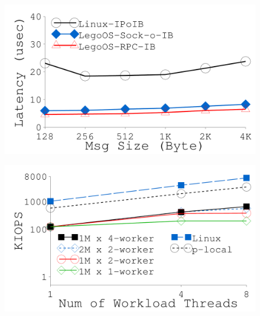 {
\begin{figure}[th]
\begin{minipage}{0.50\columnwidth}
\begin{center}
\centerline{\includegraphics[width=1.0\columnwidth]{Figures/g_plot_LEGO_latency.pdf}}
\vspace{-0.1in}
{
}
\end{center}
\end{minipage}
\begin{minipage}{0.50\columnwidth}
\vspace{0.13in}
\begin{center}
\centerline{\includegraphics[width=1.0\columnwidth]{Figures/g_plot_LEGO_iops_memory.pdf}}
\vspace{-0.1in}
{
}
\end{center}
\end{minipage}
\begin{minipage}{0.50\columnwidth}

\end{minipage}
\end{figure}}

